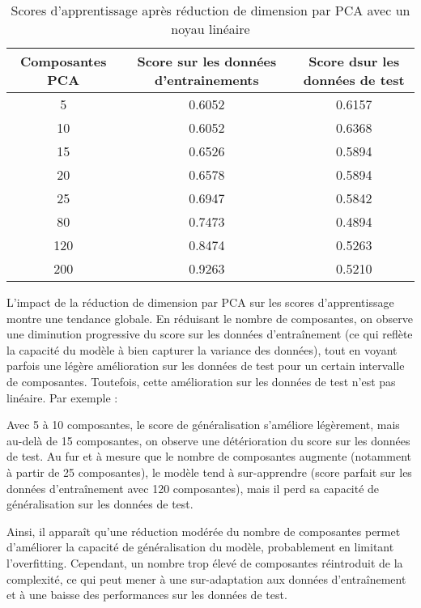 \documentclass{article}
\begin{document}
\begin{table}[h]
    \centering
    \begin{tabular}{|c|c|c|}
        \hline
        \textbf{Composantes PCA} & \textbf{Score sur les données d'entrainements} & \textbf{Score dsur les données de test} \\
        \hline
        5   & 0.6052 & 0.6157 \\
        \hline
        10   & 0.6052 & 0.6368 \\
        \hline
        15   & 0.6526 & 0.5894 \\
        \hline
        20  & 0.6578 & 0.5894 \\
        \hline
        25   & 0.6947 & 0.5842 \\
        \hline
        80  & 0.7473 & 0.4894 \\
        \hline
        120 & 0.8474 & 0.5263 \\
        \hline
        200 & 0.9263 & 0.5210 \\
        \hline
    \end{tabular}
    \caption{Scores d'apprentissage après réduction de dimension par PCA avec un noyau linéaire}
    \label{tab:scores_pca}
\end{table}

L'impact de la réduction de dimension par PCA sur les scores d'apprentissage montre une tendance globale. En réduisant le nombre de composantes, on observe une diminution progressive du score sur les données d'entraînement (ce qui reflète la capacité du modèle à bien capturer la variance des données), tout en voyant parfois une légère amélioration sur les données de test pour un certain intervalle de composantes.
Toutefois, cette amélioration sur les données de test n'est pas linéaire. Par exemple :

Avec 5 à 10 composantes, le score de généralisation s'améliore légèrement, mais au-delà de 15 composantes, on observe une détérioration du score sur les données de test.
Au fur et à mesure que le nombre de composantes augmente (notamment à partir de 25 composantes), le modèle tend à sur-apprendre (score parfait sur les données d'entraînement avec 120 composantes), mais il perd sa capacité de généralisation sur les données de test.

Ainsi, il apparaît qu'une réduction modérée du nombre de composantes permet d'améliorer la capacité de généralisation du modèle, probablement en limitant l'overfitting. Cependant, un nombre trop élevé de composantes réintroduit de la complexité, ce qui peut mener à une sur-adaptation aux données d'entraînement et à une baisse des performances sur les données de test.
\end{document}
